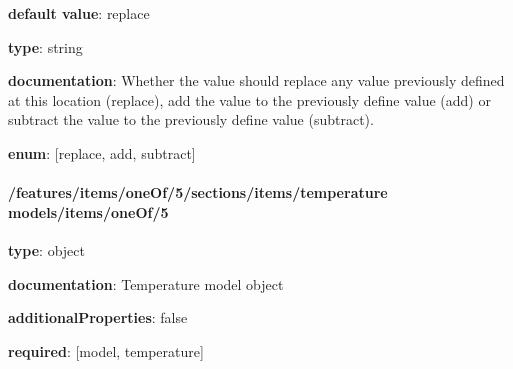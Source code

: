 \begin{itemized}
\item {\bf default value}: replace
\item {\bf type}: string
\item {\bf documentation}: Whether the value should replace any value previously defined at this location (replace), add the value to the previously define value (add) or subtract the value to the previously define value (subtract).
\item {\bf enum}: [replace, add, subtract]\end{itemized}\paragraph{/features/items/oneOf/5/sections/items/temperature models/items/oneOf/5} \begin{itemized}
\item {\bf type}: object
\item {\bf documentation}: Temperature model object
\item {\bf additionalProperties}: false
\item {\bf required}: [model, temperature]\end{itemized}
